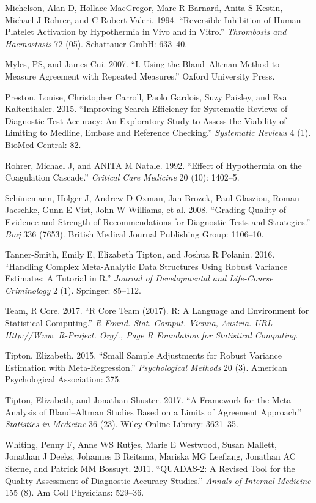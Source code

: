 \documentclass[smallextended]{svjour3}       %
\begin{document}
\leavevmode\hypertarget{ref-michelson1994reversible}{}%
Michelson, Alan D, Hollace MacGregor, Marc R Barnard, Anita S Kestin,
Michael J Rohrer, and C Robert Valeri. 1994. ``Reversible Inhibition of
Human Platelet Activation by Hypothermia in Vivo and in Vitro.''
\emph{Thrombosis and Haemostasis} 72 (05). Schattauer GmbH: 633--40.

\leavevmode\hypertarget{ref-myles2007using}{}%
Myles, PS, and James Cui. 2007. ``I. Using the Bland--Altman Method to
Measure Agreement with Repeated Measures.'' Oxford University Press.

\leavevmode\hypertarget{ref-preston2015improving}{}%
Preston, Louise, Christopher Carroll, Paolo Gardois, Suzy Paisley, and
Eva Kaltenthaler. 2015. ``Improving Search Efficiency for Systematic
Reviews of Diagnostic Test Accuracy: An Exploratory Study to Assess the
Viability of Limiting to Medline, Embase and Reference Checking.''
\emph{Systematic Reviews} 4 (1). BioMed Central: 82.

\leavevmode\hypertarget{ref-rohrer1992effect}{}%
Rohrer, Michael J, and ANITA M Natale. 1992. ``Effect of Hypothermia on
the Coagulation Cascade.'' \emph{Critical Care Medicine} 20 (10):
1402--5.

\leavevmode\hypertarget{ref-schunemann2008grading}{}%
Schünemann, Holger J, Andrew D Oxman, Jan Brozek, Paul Glasziou, Roman
Jaeschke, Gunn E Vist, John W Williams, et al. 2008. ``Grading Quality
of Evidence and Strength of Recommendations for Diagnostic Tests and
Strategies.'' \emph{Bmj} 336 (7653). British Medical Journal Publishing
Group: 1106--10.

\leavevmode\hypertarget{ref-tanner2016handling}{}%
Tanner-Smith, Emily E, Elizabeth Tipton, and Joshua R Polanin. 2016.
``Handling Complex Meta-Analytic Data Structures Using Robust Variance
Estimates: A Tutorial in R.'' \emph{Journal of Developmental and
Life-Course Criminology} 2 (1). Springer: 85--112.

\leavevmode\hypertarget{ref-team2017r}{}%
Team, R Core. 2017. ``R Core Team (2017). R: A Language and Environment
for Statistical Computing.'' \emph{R Found. Stat. Comput. Vienna,
Austria. URL Http://Www. R-Project. Org/., Page R Foundation for
Statistical Computing}.

\leavevmode\hypertarget{ref-tipton2015small}{}%
Tipton, Elizabeth. 2015. ``Small Sample Adjustments for Robust Variance
Estimation with Meta-Regression.'' \emph{Psychological Methods} 20 (3).
American Psychological Association: 375.

\leavevmode\hypertarget{ref-tipton2017framework}{}%
Tipton, Elizabeth, and Jonathan Shuster. 2017. ``A Framework for the
Meta-Analysis of Bland--Altman Studies Based on a Limits of Agreement
Approach.'' \emph{Statistics in Medicine} 36 (23). Wiley Online Library:
3621--35.

\leavevmode\hypertarget{ref-whiting2011quadas}{}%
Whiting, Penny F, Anne WS Rutjes, Marie E Westwood, Susan Mallett,
Jonathan J Deeks, Johannes B Reitsma, Mariska MG Leeflang, Jonathan AC
Sterne, and Patrick MM Bossuyt. 2011. ``QUADAS-2: A Revised Tool for the
Quality Assessment of Diagnostic Accuracy Studies.'' \emph{Annals of
Internal Medicine} 155 (8). Am Coll Physicians: 529--36.



\end{document}
